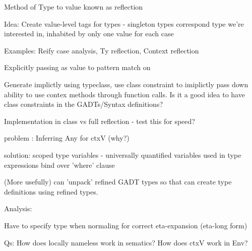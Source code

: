Method of Type to value known as reflection \cite{SingletonsGuide}

Idea: Create value-level tags for types - singleton types correspond type we're interested in, inhabited by only one value for each case

Examples: Reify case analysis, Ty reflection, Context reflection

Explicitly passing as value to pattern match on

Generate implictly using typeclass, use class constraint to imiplictly pass down ability to use contex methods through function calls.
Is it a good idea to have class constraints in the GADTs/Syntax definitions?

Implementation in class vs full reflection - test this for speed?

problem : Inferring Any for ctxV (why?)

solution: scoped type variables - universally quantified variables used in type expressions bind over 'where' clause

(More usefully) can 'unpack' refined GADT types so that can create type definitions using refined types.

Analysis:

Have to specify type when normaling for correct eta-expansion (eta-long form)

Qs:
How does locally nameless work in sematics?
How does ctxV work in Env?
